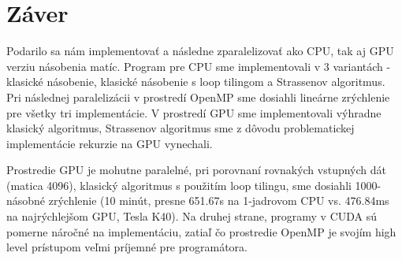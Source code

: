 \documentclass[slovak]{article}
\begin{document}
\section{Záver}

Podarilo sa nám implementovať a následne zparalelizovať ako CPU, tak aj GPU verziu násobenia matíc. Program pre CPU sme implementovali v 3 variantách - klasické násobenie, klasické násobenie s loop tilingom a Strassenov algoritmus. Pri následnej paralelizácii v prostredí OpenMP sme dosiahli lineárne zrýchlenie pre všetky tri implementácie. V prostredí GPU sme implementovali výhradne klasický algoritmus, Strassenov algoritmus sme z dôvodu problematickej implementácie rekurzie na GPU vynechali.

Prostredie GPU je mohutne paralelné, pri porovnaní rovnakých vstupných dát (matica 4096), klasický algoritmus s použitím loop tilingu, sme dosiahli 1000-násobné zrýchlenie (10 minút, presne 651.67s na 1-jadrovom CPU vs. 476.84ms na najrýchlejšom GPU, Tesla K40). Na druhej strane, programy v CUDA sú pomerne náročné na implementáciu, zatiaľ čo prostredie OpenMP je svojím high level prístupom veľmi príjemné pre programátora.
\end{document}

